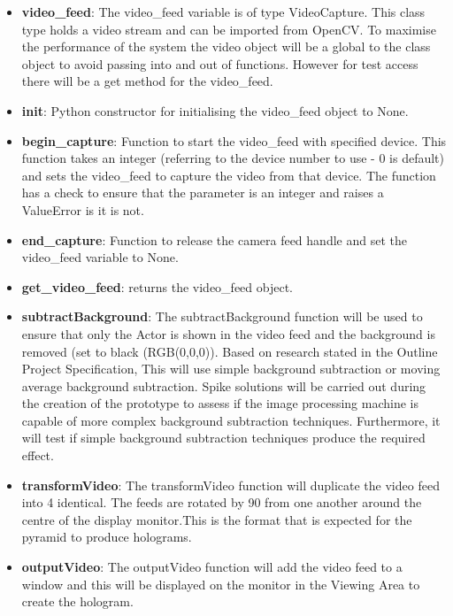 \documentclass{article}
\begin{document}
\begin{itemize}

	\item \textbf{video\_feed}: The video\_feed variable is of type VideoCapture. This class type holds a video stream and can be imported from OpenCV. To maximise the performance of the system the video object will be a global to the class object to avoid passing into and out of functions. However for test access there will be a get method for the video\_feed.
	
	\item \textbf{init}: Python constructor for initialising the video\_feed object to None.
	
	\item \textbf{begin\_capture}: Function to start the video\_feed with specified device. This function takes an integer (referring to the device number to use - 0 is default) and sets the video\_feed to capture the video from that device. The function has a check to ensure that the parameter is an integer and raises a ValueError is it is not.
	
	\item \textbf{end\_capture}: Function to release the camera feed handle and set the video\_feed variable to None.
	
	\item \textbf{get\_video\_feed}: returns the video\_feed object.   

	\item \textbf{subtractBackground}: The subtractBackground function will be used to ensure that only the Actor is shown in the video feed and the background is removed (set to black (RGB(0,0,0)). Based on research stated in the Outline Project Specification, This will use simple background subtraction or moving average background subtraction. Spike solutions will be carried out during the creation of the prototype to assess if the image processing machine is capable of more complex background subtraction techniques. Furthermore, it will test if simple background subtraction techniques produce the required effect.

	\item \textbf{transformVideo}: The transformVideo function will duplicate the video feed into 4 identical. The feeds are rotated by 90 from one another around the centre of the display monitor.This is the format that is expected for the pyramid to produce holograms.

	\item \textbf{outputVideo}: The outputVideo function will add the video feed to a window and this will be displayed on the monitor in the Viewing Area to create the hologram.

\end{itemize}
\end{document}
